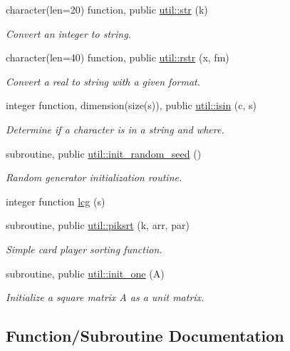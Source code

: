 \begin{DoxyCompactItemize}
\item 
character(len=20) function, public \hyperlink{namespaceutil_a1df36d0696c9183ceb6bb770f1d88111}{util\+::str} (k)
\begin{DoxyCompactList}\small\item\em Convert an integer to string. \end{DoxyCompactList}\item 
character(len=40) function, public \hyperlink{namespaceutil_ac1630658a46867b1f7255eaa51198bf3}{util\+::rstr} (x, fm)
\begin{DoxyCompactList}\small\item\em Convert a real to string with a given format. \end{DoxyCompactList}\item 
integer function, dimension(size(s)), public \hyperlink{namespaceutil_a1e2cd46baa2070e28949e28c8a3e037e}{util\+::isin} (c, s)
\begin{DoxyCompactList}\small\item\em Determine if a character is in a string and where. \end{DoxyCompactList}\item 
subroutine, public \hyperlink{namespaceutil_a3c2dcf05b068a55f0066d2b393e75dc7}{util\+::init\+\_\+random\+\_\+seed} ()
\begin{DoxyCompactList}\small\item\em Random generator initialization routine. \end{DoxyCompactList}\item 
integer function \hyperlink{util_8f90_a669ac8da4cdd11efd16a0ef72a4f7915}{lcg} (s)
\item 
subroutine, public \hyperlink{namespaceutil_af8d0a8ec8cb7391ddbf455dc92f2189d}{util\+::piksrt} (k, arr, par)
\begin{DoxyCompactList}\small\item\em Simple card player sorting function. \end{DoxyCompactList}\item 
subroutine, public \hyperlink{namespaceutil_aca7f2465fedb87fef954d8f0c30668c7}{util\+::init\+\_\+one} (A)
\begin{DoxyCompactList}\small\item\em Initialize a square matrix A as a unit matrix. \end{DoxyCompactList}\end{DoxyCompactItemize}


\subsection{Function/\+Subroutine Documentation}
